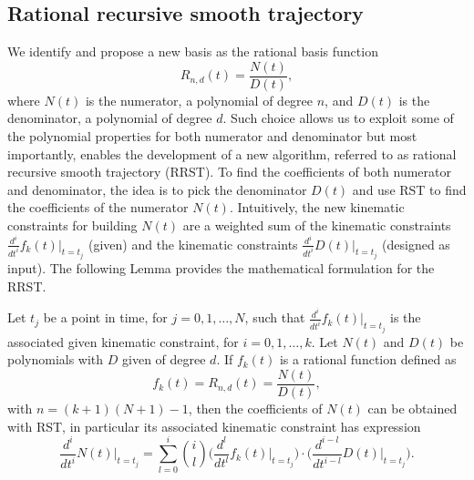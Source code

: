 \subsection{Rational recursive smooth trajectory}
We identify and propose a new basis as the rational basis function
\begin{equation}
R_{n,d}(t) = \frac{N(t)}{D(t)},
\end{equation}
where $N(t)$ is the numerator, a polynomial of degree $n$, and $D(t)$ is the denominator, a polynomial of degree $d$.
Such choice allows us to exploit some of the polynomial properties for both numerator and denominator but most importantly, enables the development of a new algorithm, referred to as rational recursive smooth trajectory (RRST). To find the coefficients of both numerator and denominator, the idea is to pick the denominator $D(t)$ and use RST to find the coefficients of the numerator $N(t)$. Intuitively, the new kinematic constraints for building $N(t)$ are a weighted sum of the kinematic constraints $\frac{d^i}{dt^i}f_k(t)\biggr|_{t=t_j}$ (given) and the kinematic constraints $\frac{d^i}{dt^i}D(t)\biggr|_{t=t_j}$ (designed as input). The following Lemma provides the mathematical formulation for the RRST.

\begin{lemma}
\label{lemma:rrst_Lemma1}
Let $t_j$ be a point in time, for $j=0,1,\dots, N$, such that $\frac{d^i}{dt^i}f_k(t)\bigr|_{t=t_j}$ is the associated given kinematic constraint, for $i=0,1,\dots, k$. Let $N(t)$ and $D(t)$ be polynomials with $D$ given of degree $d$. If $f_k(t)$ is a rational function defined as
\begin{equation}
f_k(t) = R_{n,d}(t) = \frac{N(t)}{D(t)},
\end{equation}
with $n=(k+1)(N+1)-1$, then the coefficients of $N(t)$ can be obtained with RST, in particular its associated kinematic constraint has expression
\begin{equation}
\frac{d^i}{dt^i}N(t)\biggr|_{t=t_j} = \sum_{l=0}^{i}{\binom{i}{l}\biggr(\frac{d^l}{dt^l}f_k(t)\bigr|_{t=t_j}\biggr) \cdot \biggr(\frac{d^{i-l}}{dt^{i-l}}D(t)\bigr|_{t=t_j}}\biggr).
\end{equation}
\end{lemma}

